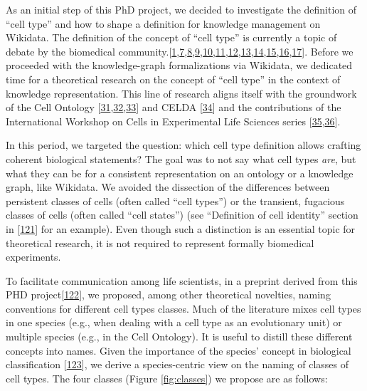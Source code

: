 As an initial step of this PhD project, we decided to investigate the definition of ``cell type'' and how to shape a definition for knowledge management on Wikidata.
The definition of the concept of ``cell type'' is currently a topic of debate by the biomedical community.{[}\protect\hyperlink{ref-pNGap1Du}{1},\protect\hyperlink{ref-paKiKTRS}{7},\protect\hyperlink{ref-sWv3okaH}{8},\protect\hyperlink{ref-19yYJWEkz}{9},\protect\hyperlink{ref-BlxFp1v3}{10},\protect\hyperlink{ref-eOUB1Bmj}{11},\protect\hyperlink{ref-TupzTvtA}{12},\protect\hyperlink{ref-w0Woz7JE}{13},\protect\hyperlink{ref-srfuRMe}{14},\protect\hyperlink{ref-1GXQByEaQ}{15},\protect\hyperlink{ref-k0Pe9YOB}{16},\protect\hyperlink{ref-MoaYZAA0}{17}{]}.
Before we proceeded with the knowledge-graph formalizations via Wikidata, we dedicated time for a theoretical research on the concept of ``cell type'' in the context of knowledge representation.
This line of research aligns itself with the groundwork of the Cell Ontology {[}\protect\hyperlink{ref-1CI8uS6ka}{31},\protect\hyperlink{ref-gAysgnsS}{32},\protect\hyperlink{ref-17U3pGEjv}{33}{]} and CELDA {[}\protect\hyperlink{ref-RLHsA1U8}{34}{]} and the contributions of the International Workshop on Cells in Experimental Life Sciences series {[}\protect\hyperlink{ref-jX2ZmXcc}{35},\protect\hyperlink{ref-rK8KD0us}{36}{]}.

In this period, we targeted the question: which cell type definition allows crafting coherent biological statements?
The goal was to not say what cell types \emph{are}, but what they can be for a consistent representation on an ontology or a knowledge graph, like Wikidata.
We avoided the dissection of the differences between persistent classes of cells (often called ``cell types'') or the transient, fugacious classes of cells (often called ``cell states'') (see ``Definition of cell identity'' section in {[}\protect\hyperlink{ref-pFijpXkl}{121}{]} for an example).
Even though such a distinction is an essential topic for theoretical research, it is not required to represent formally biomedical experiments.

To facilitate communication among life scientists, in a preprint derived from this PHD project{[}\protect\hyperlink{ref-uCE45Jh8}{122}{]}, we proposed, among other theoretical novelties, naming conventions for different cell types classes.
Much of the literature mixes cell types in one species (e.g., when dealing with a cell type as an evolutionary unit) or multiple species (e.g., in the Cell Ontology).
It is useful to distill these different concepts into names. Given the importance of the species' concept in biological classification {[}\protect\hyperlink{ref-AHGRV6KQ}{123}{]}, we derive a species-centric view on the naming of classes of cell types.
The four classes (Figure \ref{fig:classes}) we propose are as follows:

